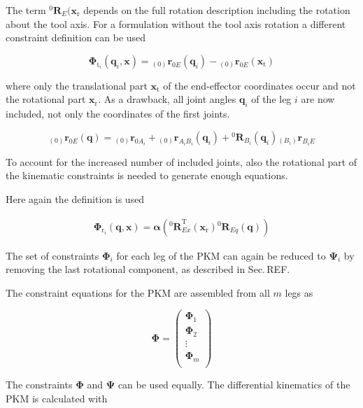 \documentclass[twocolumn,10pt]{IFTOMM}
\newcommand{\bm}[1]{\boldsymbol{#1}}
\newcommand{\ortvek}[4]{{ }_{(#1)}{\boldsymbol{#2}}^{#3}_{#4} }
\newcommand{\rotmat}[2]{{{ }^{#1}\boldsymbol{R}}_{#2}}
\newcommand{\transp}[0]{{\mathrm{T}}}
\begin{document}
The term $\rotmat{0}{E}(\bm{x}_{\mathrm{r}}$ depends on the full rotation description including the rotation about the tool axis.
For a formulation without the tool axis rotation a different constraint definition can be used

\begin{equation}
\bm{\Phi}_{\mathrm{t}_i}(\bm{q}_i,\bm{x}) = 
\ortvek{0}{r}{}{0E}(\bm{q}_i) - \ortvek{0}{r}{}{0E}(\bm{x}_{\mathrm{t}})
\end{equation}

where only the translational part $\bm{x}_{\mathrm{t}}$ of the end-effector coordinates occur and not the rotational part $\bm{x}_{\mathrm{r}}$.
As a drawback, all joint angles $\bm{q}_i$ of the leg $i$ are now included, not only the coordinates of the first joints.

\begin{equation}
\ortvek{0}{r}{}{0E}(\bm{q}) = 
\ortvek{0}{r}{}{0A_i}
+ \ortvek{0}{r}{}{A_iB_i}(\bm{q}_i) + \rotmat{0}{B_i}(\bm{q}_i) \ortvek{B_i}{r}{}{B_iE}
\end{equation}

To account for the increased number of included joints, also the rotational part of the kinematic constraints is needed to generate enough equations.

Here again the definition is used

\begin{align}
\bm{\Phi}_{\mathrm{r}_i}(\bm{q},\bm{x})
=\bm{\alpha}\left(\rotmat{0}{Ex}^\transp (\bm{x}_{\mathrm{r}})\rotmat{0}{Eq}(\bm{q})\right)
\end{align}

The set of constraints $\bm{\Phi}_{i}$ for each leg of the PKM can again be reduced to $\bm{\Psi}_{i}$ by removing the last rotational component, as described in Sec.\,REF.

The constraint equations for the PKM are assembled from all $m$ legs as


\begin{equation}
\bm{\Phi}
=
\begin{pmatrix}
\bm{\Phi}_1 \\
\bm{\Phi}_2 \\
\vdots \\
\bm{\Phi}_m \\
\end{pmatrix}
\end{equation}

The constraints $\bm{\Phi}$ and $\bm{\Psi}$ can be used equally.
The differential kinematics of the PKM is calculated with
\end{document}

